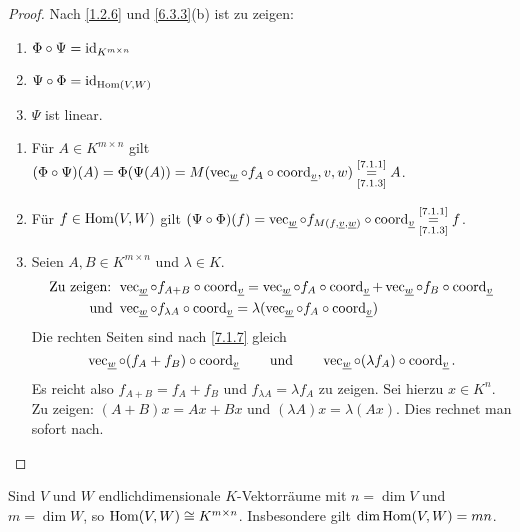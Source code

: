 \documentclass[../../main.tex]{subfiles}
\begin{document}
\begin{proof}
Nach \ref{1.2.6} und \ref{6.3.3}(b) ist zu zeigen:
\begin{enumerate}[\normalfont(a)]
\item $\Phi \circ \Psi = \operatorname{id}_{K^{m\times n}}$
\item $\Psi \circ \Phi = \operatorname{id}_{\operatorname{Hom}(V,W)}$
\item $\Psi$ ist linear.
\end{enumerate}
\begin{enumerate}[Zu (a).]
\item Für $A\in K^{m\times n}$ gilt $(\Phi \circ \Psi)(A) = \Phi(\Psi(A)) = M(\operatorname{vec}_{\underline{w}}\circ f_A\circ \operatorname{coord}_{\underline{v}}, v, w) \overset{\text{\ref{7.1.1}}}{\underset{\text{\ref{7.1.3}}}{=}} A$.
\item Für $f\in \operatorname{Hom}(V,W)$ gilt $(\Psi \circ \Phi)(f) = \operatorname{vec}_{\underline{w}} \circ f_{M(f,\underline{v},\underline{w})} \circ \operatorname{coord}_{\underline{v}} \overset{\text{\ref{7.1.1}}}{\underset{\text{\ref{7.1.3}}}{=}} f$.
\item Seien $A,B \in K^{m\times n}$ und $\lambda\in K$.
\begin{align*}
\text{Zu zeigen: } & \operatorname{vec}_{\underline{w}} \circ f_{A+B} \circ \operatorname{coord}_{\underline{v}} = \operatorname{vec}_{\underline{w}}\circ f_A \circ \operatorname{coord}_{\underline{v}} + \operatorname{vec}_{\underline{w}} \circ f_B \circ \operatorname{coord}_{\underline{v}}\\
\text{und } & \operatorname{vec}_{\underline{w}}\circ f_{\lambda A} \circ \operatorname{coord}_{\underline{v}} = \lambda(\operatorname{vec}_{\underline{w}}\circ f_A \circ \operatorname{coord}_{\underline{v}})
\end{align*}
Die rechten Seiten sind nach \ref{7.1.7} gleich
$$\operatorname{vec}_{\underline{w}}\circ (f_A+f_B) \circ \operatorname{coord}_{\underline{v}} \qquad\text{und}\qquad \operatorname{vec}_{\underline{w}}\circ (\lambda f_A)\circ \operatorname{coord}_{\underline{v}}.$$
Es reicht also $f_{A+B} = f_A + f_B$ und $f_{\lambda A} = \lambda f_A$ zu zeigen. Sei hierzu $x\in K^n$. Zu zeigen: $(A+B)x = Ax + Bx$ und $(\lambda A)x = \lambda (Ax)$. Dies rechnet man sofort nach.
\end{enumerate}
\end{proof}

\begin{kor}\label{7.1.9}
Sind $V$ und $W$ endlichdimensionale $K$-Vektorräume mit $n = \dim V$ und $m=\dim W$, so $\operatorname{Hom}(V,W)\cong K^{m\times n}$. Insbesondere gilt $\dim \operatorname{Hom} (V,W) = mn$.
\end{kor}
\end{document}
